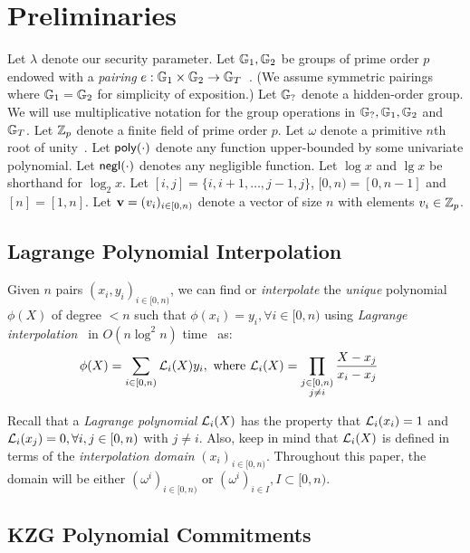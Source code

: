 \section{Preliminaries}
\label{s:prelim}

Let $\lambda$ denote our security parameter.
Let $\mathbb{G}_1,\mathbb{G}_2$ be groups of prime order $p$ endowed with a \textit{pairing} $e : \mathbb{G}_1 \times \mathbb{G}_2 \rightarrow \mathbb{G}_T$~\cite{MVO91,Joux00}.
(We assume symmetric pairings where $\mathbb{G}_1=\mathbb{G}_2$ for simplicity of exposition.)
Let $\mathbb{G}_{?}$ denote a hidden-order group.
We will use multiplicative notation for the group operations in $\mathbb{G}_{?},\mathbb{G}_1,\mathbb{G}_2$ and $\mathbb{G}_T$.
Let $\mathbb{Z}_p$ denote a finite field of prime order $p$.
Let $\omega$ denote a primitive $n$th root of unity~\cite{vG13ModernCh8}.
Let $\mathsf{poly}(\cdot)$ denote any function upper-bounded by some univariate polynomial.
Let $\mathsf{negl}(\cdot)$ denotes any negligible function.
Let $\log{x}$ and $\lg{x}$ be shorthand for $\log_2{x}$.
Let $[i,j] = \{i,i+1,\dots,j-1,j\}$, $[0,n) =[0,n-1]$ and $[n]=[1,n]$.
Let $\bm{\mathrm{v}}=(v_i)_{i\in[0,n)}$ denote a vector of size $n$ with elements $v_i\in \mathbb{Z}_p$.

\subsection{Lagrange Polynomial Interpolation}
\label{s:prelim:interpolation}
Given $n$ pairs $(x_i, y_i)_{i\in[0,n)}$, we can find or \textit{interpolate} the \textit{unique} polynomial $\phi(X)$ of degree $<n$ such that $\phi(x_i) = y_i, \forall i\in[0,n)$ using \textit{Lagrange interpolation}~\cite{BT04} in $O(n\log^2{n})$ time~\cite{vG13ModernCh10} as:
\begin{align}
\phi(X) &= \sum_{i\in[0,n)} \lagr_i(X) y_i,\ \text{where}\ \lagr_i(X) = \prod_{\substack{j\in [0,n)\\j\ne i}}\frac{X-x_j}{x_i-x_j}
\end{align}

Recall that a \textit{Lagrange polynomial} $\mathcal{L}_i(X)$ has the property that $\mathcal{L}_i(x_i) = 1$ and $\mathcal{L}_i(x_j)=0, \forall i,j\in[0,n)$ with $j \ne i$.
Also, keep in mind that $\mathcal{L}_i(X)$ is defined in terms of the \textit{interpolation domain} $(x_i)_{i\in [0,n)}$.
Throughout this paper, the domain will be either $(\omega^i)_{i\in[0,n)}$ or $(\omega^i)_{i\in I}, I\subset [0,n)$.

\subsection{KZG Polynomial Commitments}
\label{s:prelim:polycommit:kzg}

